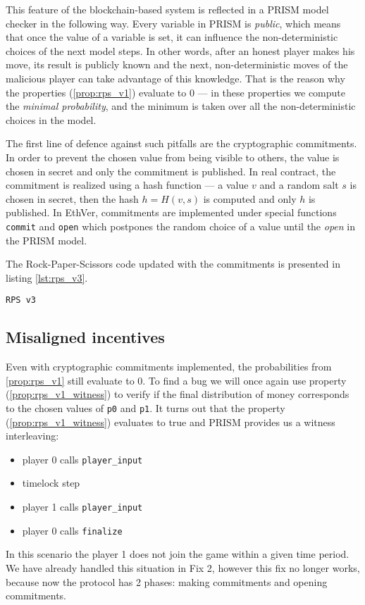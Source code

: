 \documentclass{article}
\begin{document}
This feature of the blockchain-based system is reflected in a PRISM model checker in the following way.
Every variable in PRISM is \emph{public}, which means that once the value of a variable is set, it can influence
the non-deterministic choices of the next model steps.
In other words, after an honest player makes his move, its result is publicly known and the next, non-deterministic
moves of the malicious player can take advantage of this knowledge.
That is the reason why the properties (\ref{prop:rps_v1}) evaluate to 0 --- in these properties we compute the
\emph{minimal probability}, and the minimum is taken over all the non-deterministic choices in the model.

The first line of defence against such pitfalls are the cryptographic commitments.
In order to prevent the chosen value from being visible to others, the value is chosen in secret and only
the commitment is published.
In real contract, the commitment is realized using a hash function --- a value $v$ and a random salt $s$ is chosen
in secret, then the hash $h = H(v, s)$ is computed and only $h$ is published.
In EthVer, commitments are implemented under special functions \lstinline{commit} and \lstinline{open} which
postpones the random choice of a value until the \emph{open} in the PRISM model.

The Rock-Paper-Scissors code updated with the commitments is presented in listing \ref{lst:rps_v3}.

%
\begin{lstlisting}[caption=RPS v3, label=lst:rps_v3]
RPS v3
\end{lstlisting}


\subsection{Misaligned incentives}

Even with cryptographic commitments implemented, the probabilities from \ref{prop:rps_v1} still evaluate to 0.
To find a bug we will once again use property (\ref{prop:rps_v1_witness}) to verify if the final distribution of money
corresponds to the chosen values of \lstinline{p0} and \lstinline{p1}.
It turns out that the property (\ref{prop:rps_v1_witness}) evaluates to true and PRISM provides us a witness 
interleaving:
\begin{itemize}
\item player 0 calls \lstinline{player_input}
\item timelock step
\item player 1 calls \lstinline{player_input}
\item player 0 calls \lstinline{finalize}
\end{itemize}
In this scenario the player 1 does not join the game within a given time period.
We have already handled this situation in Fix 2, however this fix no longer works, because now the protocol
has 2 phases: making commitments and opening commitments.
\end{document}
